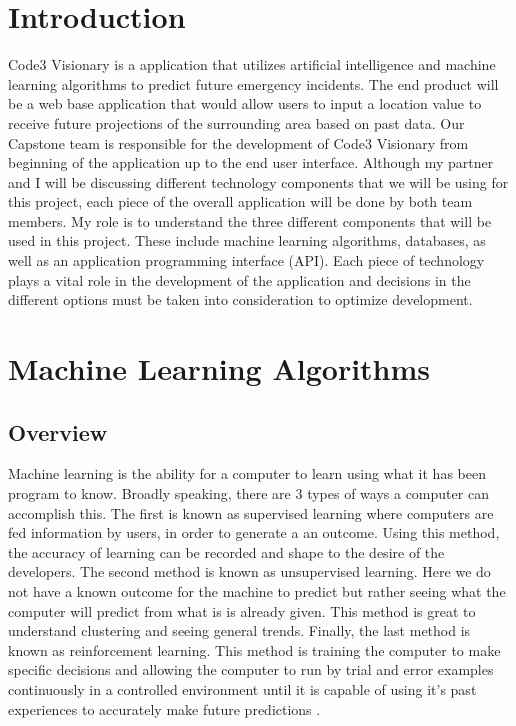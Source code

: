 \documentclass[10pt, onecolumn, draftclsnofoot, letterpaper, compsoc]{IEEEtran}
\begin{document}
\section{Introduction}
Code3 Visionary is a application that utilizes artificial intelligence and machine learning algorithms to predict future emergency incidents.
The end product will be a web base application that would allow users to input a location value to receive future projections of the surrounding area based on past data.
Our Capstone team is responsible for the development of Code3 Visionary from beginning of the application up to the end user interface.
Although my partner and I will be discussing different technology components that we will be using for this project, each piece of the overall application will be done by both team members.
My role is to understand the three different components that will be used in this project.
These include machine learning algorithms, databases, as well as an application programming interface (API). 
Each piece of technology plays a vital role in the development of the application and decisions in the different options must be taken into consideration to optimize development.

\section{Machine Learning Algorithms}

\subsection{Overview}
Machine learning is the ability for a computer to learn using what it has been program to know.
Broadly speaking, there are 3 types of ways a computer can accomplish this. 
The first is known as supervised learning where computers are fed information by users, in order to generate a an outcome.
Using this method, the accuracy of learning can be recorded and shape to the desire of the developers.
The second method is known as unsupervised learning. 
Here we do not have a known outcome for the machine to predict but rather seeing what the computer will predict from what is is already given.
This method is great to understand clustering and seeing general trends.
Finally, the last method is known as reinforcement learning. 
This method is training the computer to make specific decisions and allowing the computer to run by trial and error examples continuously in a controlled environment until it is capable of using it's past experiences to accurately make future predictions \cite{machinelearning}.
\end{document}
